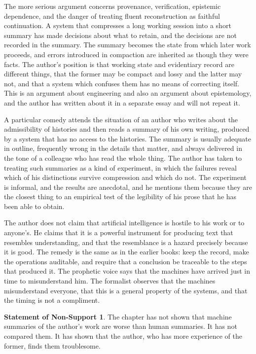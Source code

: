 \documentclass[11pt,openany,twoside]{book}
\theoremstyle{plain}
\theoremstyle{definition}
\newtheorem{nonsupport}{Statement of Non-Support}
\theoremstyle{remark}
\begin{document}
The more serious argument concerns provenance, verification, epistemic dependence, and the danger of treating fluent reconstruction as faithful continuation. A system that compresses a long working session into a short summary has made decisions about what to retain, and the decisions are not recorded in the summary. The summary becomes the state from which later work proceeds, and errors introduced in compaction are inherited as though they were facts. The author's position is that working state and evidentiary record are different things, that the former may be compact and lossy and the latter may not, and that a system which confuses them has no means of correcting itself. This is an argument about engineering and also an argument about epistemology, and the author has written about it in a separate essay and will not repeat it.

A particular comedy attends the situation of an author who writes about the admissibility of histories and then reads a summary of his own writing, produced by a system that has no access to the histories. The summary is usually adequate in outline, frequently wrong in the details that matter, and always delivered in the tone of a colleague who has read the whole thing. The author has taken to treating such summaries as a kind of experiment, in which the failures reveal which of his distinctions survive compression and which do not. The experiment is informal, and the results are anecdotal, and he mentions them because they are the closest thing to an empirical test of the legibility of his prose that he has been able to obtain.

The author does not claim that artificial intelligence is hostile to his work or to anyone's. He claims that it is a powerful instrument for producing text that resembles understanding, and that the resemblance is a hazard precisely because it is good. The remedy is the same as in the earlier books: keep the record, make the operations auditable, and require that a conclusion be traceable to the steps that produced it. The prophetic voice says that the machines have arrived just in time to misunderstand him. The formalist observes that the machines misunderstand everyone, that this is a general property of the systems, and that the timing is not a compliment.

\begin{nonsupport}
The chapter has not shown that machine summaries of the author's work are worse than human summaries. It has not compared them. It has shown that the author, who has more experience of the former, finds them troublesome.
\end{nonsupport}
\end{document}
